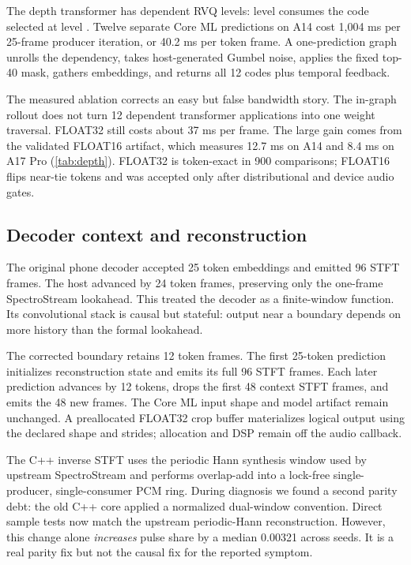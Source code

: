 \documentclass[10pt]{article}
\begin{document}
The depth transformer has dependent RVQ levels: level \texttt{} consumes the code selected at level \texttt{}. Twelve separate Core ML predictions on A14 cost 1,004 ms per 25-frame producer iteration, or 40.2 ms per token frame. A one-prediction graph unrolls the dependency, takes host-generated Gumbel noise, applies the fixed top-40 mask, gathers embeddings, and returns all 12 codes plus temporal feedback.

The measured ablation corrects an easy but false bandwidth story. The in-graph rollout does not turn 12 dependent transformer applications into one weight traversal. FLOAT32 still costs about 37 ms per frame. The large gain comes from the validated FLOAT16 artifact, which measures 12.7 ms on A14 and 8.4 ms on A17 Pro (\cref{tab:depth}). FLOAT32 is token-exact in 900 comparisons; FLOAT16 flips near-tie tokens and was accepted only after distributional and device audio gates.

\subsection{Decoder context and reconstruction}
The original phone decoder accepted 25 token embeddings and emitted 96 STFT frames. The host advanced by 24 token frames, preserving only the one-frame SpectroStream lookahead. This treated the decoder as a finite-window function. Its convolutional stack is causal but stateful: output near a boundary depends on more history than the formal lookahead.

The corrected boundary retains 12 token frames. The first 25-token prediction initializes reconstruction state and emits its full 96 STFT frames. Each later prediction advances by 12 tokens, drops the first 48 context STFT frames, and emits the 48 new frames. The Core ML input shape and model artifact remain unchanged. A preallocated FLOAT32 crop buffer materializes logical output using the declared \texttt{} shape and strides; allocation and DSP remain off the audio callback.

The C++ inverse STFT uses the periodic Hann synthesis window used by upstream SpectroStream and performs overlap-add into a lock-free single-producer, single-consumer PCM ring. During diagnosis we found a second parity debt: the old C++ core applied a normalized dual-window convention. Direct sample tests now match the upstream periodic-Hann reconstruction. However, this change alone \emph{increases} pulse share by a median 0.00321 across seeds. It is a real parity fix but not the causal fix for the reported symptom.
\end{document}
